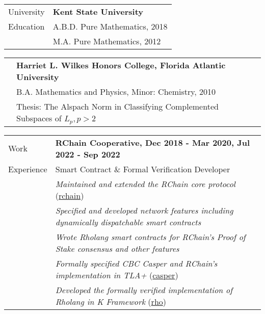 \documentclass[letterpaper,10pt,oneside]{article}
\begin{document}
\vspace{0.1in}



\noindent \begin{tabular}{@{} l l}
 \Large{University} & \textbf{Kent State University} \\
 \Large{Education} & A.B.D. Pure Mathematics, 2018 \\
 \hspace{1.1in} & M.A. Pure Mathematics, 2012 \\
\end{tabular}

\vfill


\noindent \begin{tabular}{@{} l l}
 \hspace{1.1in} & \textbf{Harriet L. Wilkes Honors College, Florida Atlantic University} \\
 & B.A. Mathematics and Physics, Minor: Chemistry, 2010 \\
 & Thesis: The Alspach Norm in Classifying Complemented Subspaces of $L_p, p>2$ \\
\end{tabular}

\vfill



\noindent \begin{tabular}{@{} l l}
 \Large{Work} & \textbf{RChain Cooperative, Dec 2018 - Mar 2020,  Jul 2022 - Sep 2022} \\
 \Large{Experience} & Smart Contract \& Formal Verification Developer \\
 \hspace{1.1in} & \emph{Maintained and extended the RChain core protocol} (\href{https://github.com/rchain/rchain}{rchain}) \\
 & \emph{Specified and developed network features including dynamically dispatchable smart contracts} \\
 & \emph{Wrote Rholang smart contracts for RChain's Proof of Stake consensus and other features} \\
 & \emph{Formally specified CBC Casper and RChain's implementation in TLA+} (\href{https://github.com/Isaac-DeFrain/TLAplus/tree/master/Casper}{casper}) \\
 & \emph{Developed the formally verified implementation of Rholang in K Framework} (\href{https://github.com/Isaac-DeFrain/KFramework/tree/master/Languages/GroundedRho}{rho}) \\
\end{tabular}
\end{document}
